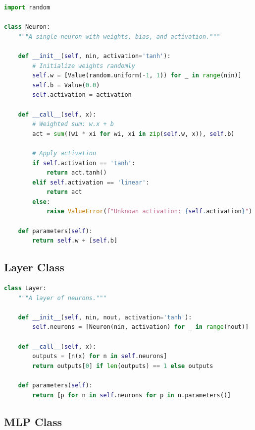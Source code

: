 \begin{lstlisting}[language=Python, caption={Neuron Implementation}]
import random

class Neuron:
    """A single neuron with weights, bias, and activation."""
    
    def __init__(self, nin, activation='tanh'):
        # Initialize weights randomly
        self.w = [Value(random.uniform(-1, 1)) for _ in range(nin)]
        self.b = Value(0.0)
        self.activation = activation
    
    def __call__(self, x):
        # Weighted sum: w.x + b
        act = sum((wi * xi for wi, xi in zip(self.w, x)), self.b)
        
        # Apply activation
        if self.activation == 'tanh':
            return act.tanh()
        elif self.activation == 'linear':
            return act
        else:
            raise ValueError(f"Unknown activation: {self.activation}")
    
    def parameters(self):
        return self.w + [self.b]
\end{lstlisting}

\subsection{Layer Class}

\begin{lstlisting}[language=Python, caption={Layer Implementation}]
class Layer:
    """A layer of neurons."""
    
    def __init__(self, nin, nout, activation='tanh'):
        self.neurons = [Neuron(nin, activation) for _ in range(nout)]
    
    def __call__(self, x):
        outputs = [n(x) for n in self.neurons]
        return outputs[0] if len(outputs) == 1 else outputs
    
    def parameters(self):
        return [p for n in self.neurons for p in n.parameters()]
\end{lstlisting}

\subsection{MLP Class}

